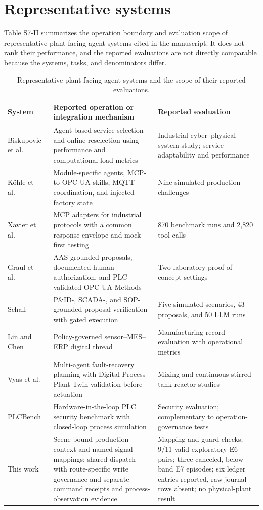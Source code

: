 \documentclass[10pt]{article}
\begin{document}
\section*{Representative systems}
Table S7-II summarizes the operation boundary and evaluation scope of representative plant-facing agent systems cited in the manuscript. It does not rank their performance, and the reported evaluations are not directly comparable because the systems, tasks, and denominators differ.

\begin{table}[htbp]
\centering
\caption{Representative plant-facing agent systems and the scope of their reported evaluations.}
\footnotesize
\setlength{\tabcolsep}{3pt}
\begin{tabularx}{\textwidth}{@{}>{\raggedright\arraybackslash}p{1.9cm}>{\raggedright\arraybackslash}p{6.2cm}X@{}}
\toprule
System & Reported operation or integration mechanism & Reported evaluation \\
\midrule
Biskupovic et al.~\cite{biskupovic2025supervision} & Agent-based service selection and online reselection using performance and computational-load metrics & Industrial cyber--physical system study; service adaptability and performance \\
K{\"o}hle et al.~\cite{koehle2026llmdriven} & Module-specific agents, MCP-to-OPC-UA skills, MQTT coordination, and injected factory state & Nine simulated production challenges \\
Xavier et al.~\cite{xavier2026industriConnect} & MCP adapters for industrial protocols with a common response envelope and mock-first testing & 870 benchmark runs and 2,820 tool calls \\
Graul et al.~\cite{graul2026aas} & AAS-grounded proposals, documented human authorization, and PLC-validated OPC UA Methods & Two laboratory proof-of-concept settings \\
Schall~\cite{schall2026safe} & P\&ID-, SCADA-, and SOP-grounded proposal verification with gated execution & Five simulated scenarios, 43 proposals, and 50 LLM runs \\
Lin and Chen~\cite{lin2026agentic} & Policy-governed sensor--MES--ERP digital thread & Manufacturing-record evaluation with operational metrics \\
Vyas et al.~\cite{vyas2026detection} & Multi-agent fault-recovery planning with Digital Process Plant Twin validation before actuation & Mixing and continuous stirred-tank reactor studies \\
PLCBench~\cite{zhou2026plcbench} & Hardware-in-the-loop PLC security benchmark with closed-loop process simulation & Security evaluation; complementary to operation-governance tests \\
This work & Scene-bound production context and named signal mappings; shared dispatch with route-specific write governance and separate command receipts and process-observation evidence & Mapping and guard checks; 9/11 valid exploratory E6 pairs; three canceled, below-band E7 episodes; six ledger entries reported, raw journal rows absent; no physical-plant result \\
\bottomrule
\end{tabularx}
\end{table}
\end{document}
